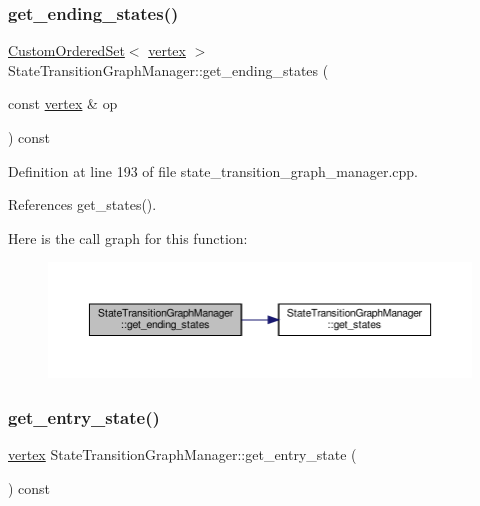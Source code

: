 \subsubsection{\texorpdfstring{get\+\_\+ending\+\_\+states()}{get\_ending\_states()}}
{\footnotesize\ttfamily \hyperlink{classCustomOrderedSet}{Custom\+Ordered\+Set}$<$ \hyperlink{graph_8hpp_abefdcf0544e601805af44eca032cca14}{vertex} $>$ State\+Transition\+Graph\+Manager\+::get\+\_\+ending\+\_\+states (\begin{DoxyParamCaption}\item[{const \hyperlink{graph_8hpp_abefdcf0544e601805af44eca032cca14}{vertex} \&}]{op }\end{DoxyParamCaption}) const}



Definition at line 193 of file state\+\_\+transition\+\_\+graph\+\_\+manager.\+cpp.



References get\+\_\+states().

Here is the call graph for this function\+:
\nopagebreak
\begin{figure}[H]
\begin{center}
\leavevmode
\includegraphics[width=350pt]{d9/dfd/classStateTransitionGraphManager_a37495566ff3376074fbc09598e669ac3_cgraph}
\end{center}
\end{figure}
\mbox{\label{classStateTransitionGraphManager_acb90f4df2f87498dc08fa9303e7adae5}} 
\subsubsection{\texorpdfstring{get\+\_\+entry\+\_\+state()}{get\_entry\_state()}}
{\footnotesize\ttfamily \hyperlink{graph_8hpp_abefdcf0544e601805af44eca032cca14}{vertex} State\+Transition\+Graph\+Manager\+::get\+\_\+entry\+\_\+state (\begin{DoxyParamCaption}{ }\end{DoxyParamCaption}) const}



